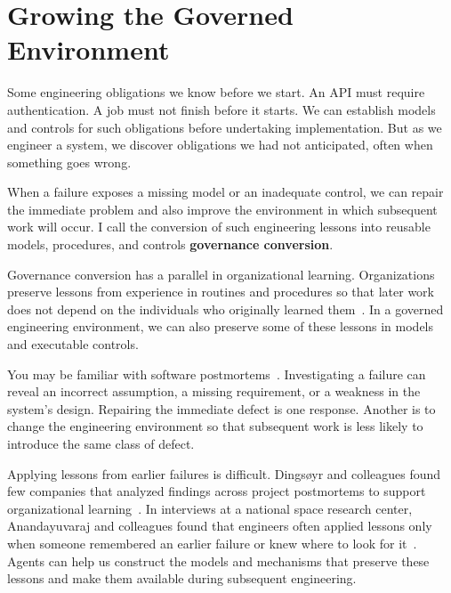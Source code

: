


\chapter{Growing the Governed Environment}



Some engineering obligations we know before we start. An API must require authentication. A job must not finish before it starts. We can establish models and controls for such obligations before undertaking implementation. But as we engineer a system, we discover obligations we had not anticipated, often when something goes wrong.

When a failure exposes a missing model or an inadequate control, we can repair the immediate problem and also improve the environment in which subsequent work will occur. I call the conversion of such engineering lessons into reusable models, procedures, and controls \textbf{governance conversion}.

Governance conversion has a parallel in organizational learning. Organizations preserve lessons from experience in routines and procedures so that later work does not depend on the individuals who originally learned them~\citep{argyris1978organizational}. In a governed engineering environment, we can also preserve some of these lessons in models and executable controls.

You may be familiar with software postmortems~\citep{dingsoyr2005postmortem}. Investigating a failure can reveal an incorrect assumption, a missing requirement, or a weakness in the system's design. Repairing the immediate defect is one response. Another is to change the engineering environment so that subsequent work is less likely to introduce the same class of defect.

Applying lessons from earlier failures is difficult. Dingsøyr and colleagues found few companies that analyzed findings across project postmortems to support organizational learning~\citep{dingsoyr2007organizational}. In interviews at a national space research center, Anandayuvaraj and colleagues found that engineers often applied lessons only when someone remembered an earlier failure or knew where to look for it~\citep{anandayuvaraj2026failures}. Agents can help us construct the models and mechanisms that preserve these lessons and make them available during subsequent engineering.

